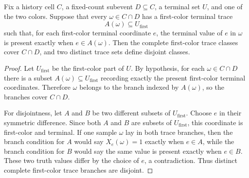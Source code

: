 \begin{helper}
Fix a history cell \(C\), a fixed-count subevent \(D\subseteq C\), a terminal
set \(U\), and one of the two colors.  Suppose that every \(\omega\in C\cap D\)
has a first-color terminal trace
\[
A(\omega)\subseteq U_{\mathrm{first}}
\]
such that, for each first-color terminal coordinate \(e\), the terminal value
of \(e\) in \(\omega\) is present exactly when \(e\in A(\omega)\).  Then the
complete first-color trace classes cover \(C\cap D\), and two distinct trace
sets define disjoint classes.
\end{helper}
\begin{proof}
Let \(U_{\mathrm{first}}\) be the first-color part of \(U\).  By hypothesis,
for each \(\omega\in C\cap D\) there is a subset
\(A(\omega)\subseteq U_{\mathrm{first}}\) recording exactly the present
first-color terminal coordinates.  Therefore \(\omega\) belongs to the branch
indexed by \(A(\omega)\), so the branches cover \(C\cap D\).

For disjointness, let \(A\) and \(B\) be two different subsets of
\(U_{\mathrm{first}}\).  Choose \(e\) in their symmetric difference.  Since
both \(A\) and \(B\) are subsets of \(U_{\mathrm{first}}\), this coordinate is
first-color and terminal.  If one sample \(\omega\) lay in both trace
branches, then the branch condition for \(A\) would say
\(X_e(\omega)=1\) exactly when \(e\in A\), while the branch condition for
\(B\) would say the same value is present exactly when \(e\in B\).  These two
truth values differ by the choice of \(e\), a contradiction.  Thus distinct
complete first-color trace branches are disjoint.
\end{proof}
